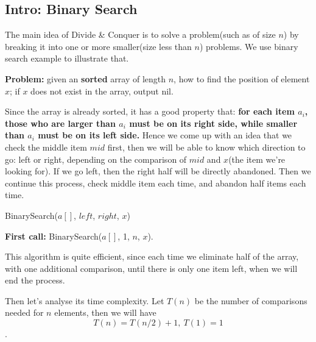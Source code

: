 
\begin{spacing}{1.3}
    
    \section{Intro: Binary Search}

    The main idea of {\rm Divide \& Conquer} is to solve a problem(such as of 
    size $n$) by breaking it into one or more smaller(size less than $n$) problems.
    We use binary search example to illustrate that.

    {\bf Problem:} given an {\bf sorted} array of length $n$, how to find 
    the position of element $x$; if $x$ does not exist
    in the array, output nil.

    Since the array is already sorted, it has a good property that:
    {\bf for each item $a_i$, those who are larger than $a_i$ must be 
    on its right side, while smaller than $a_i$ must be on its left side.}
    Hence we come up with an idea that we check the middle item $mid$ first,
    then we will be able to know which direction to go: left or right,
    depending on the comparison of $mid$ and $x$(the item we're looking for).
    If we go left, then the right half will be directly abandoned.
    Then we continue this process, check middle item each time, and 
    abandon half items each time.

    \newpage
    \begin{algorithm}[H]
        \caption{BinarySearch($a[]$, $left$, $right$, $x$)}
    \end{algorithm}

    {\bf First call:} BinarySearch($a[]$, 1, $n$, $x$).

    This algorithm is quite efficient, since each time 
    we eliminate half of the array, with one additional 
    comparison, until there is only one item left,
    when we will end the process.

    Then let's analyse its time complexity. Let $T(n)$ be the number of 
    comparisons needed for $n$ elements, then we will have
    $$T(n)=T(n/2)+1,\ T(1)=1$$.


\end{spacing}
